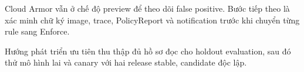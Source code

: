 Cloud Armor vẫn ở chế độ preview để theo dõi false positive. Bước tiếp theo là xác minh chữ ký image, trace, PolicyReport và notification trước khi chuyển từng rule sang Enforce.

Hướng phát triển ưu tiên thu thập đủ hồ sơ đọc cho holdout evaluation, sau đó thử mô hình lai và canary với hai release stable, candidate độc lập.
